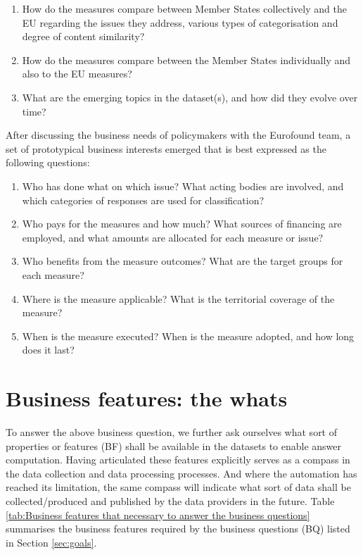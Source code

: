 \begin{enumerate}
	\item How do the measures compare between Member States collectively and the EU regarding the issues they address, various types of categorisation and degree of content similarity?
	\item How do the measures compare between the Member States individually and also to the EU measures? 
	\item What are the emerging topics in the dataset(s), and how did they evolve over time? 
\end{enumerate}

After discussing the business needs of policymakers with the Eurofound team, a set of prototypical business interests emerged that is best expressed as the following questions:

\begin{enumerate}
	\item Who has done what on which issue? What acting bodies are involved, and which categories of responses are used for classification?
	\item Who pays for the measures and how much? What sources of financing are employed, and what amounts are allocated for each measure or issue?
	\item Who benefits from the measure outcomes? What are the target groups for each measure?
	\item Where is the measure applicable? What is the territorial coverage of the measure? 
	\item When is the measure executed? When is the measure adopted, and how long does it last? 
\end{enumerate}

\section{Business features: the whats}

To answer the above business question, we further ask ourselves what sort of properties or features (BF) shall be available in the datasets to enable answer computation. Having articulated these features explicitly serves as a compass in the data collection and data processing processes. And where the automation has reached its limitation, the same compass will indicate what sort of data shall be collected/produced and published by the data providers in the future. Table \ref{tab:Business features that necessary to answer the business questions} summarises the business features required by the business questions (BQ) listed in Section \ref{sec:goals}.

